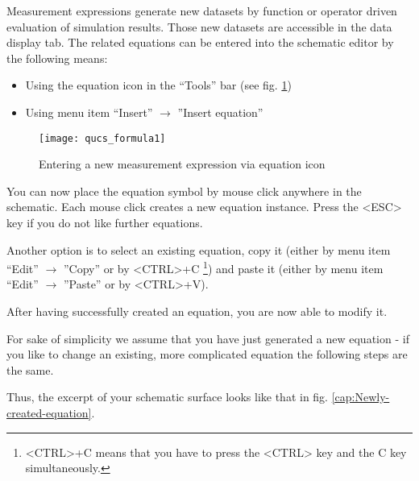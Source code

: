 \providecommand{\boldsymbol}[1]{\mbox{\boldmath $#1$}}

\providecommand{\tabularnewline}{\\}


Measurement expressions generate new datasets by function or operator
driven evaluation of simulation results. Those new datasets are accessible
in the data display tab. The related equations can be entered into
the schematic editor by the following means:

\begin{itemize}
\item Using the equation icon in the {}``Tools'' bar (see fig. \ref{cap:Entering})
\item Using menu item {}``Insert'' $\rightarrow$ ''Insert equation''
\end{itemize}
%
\begin{figure}[ht]
\begin{center}\texttt{[image: qucs\_formula1]}\end{center}


\caption{\label{cap:Entering}Entering a new measurement expression via equation
icon}
\end{figure}


\noindent You can now place the equation symbol by mouse click anywhere
in the schematic. Each mouse click creates a new equation instance.
Press the <ESC> key if you do not like further equations.

Another option is to select an existing equation, copy it (either
by menu item {}``Edit'' $\rightarrow$ ''Copy'' or by <CTRL>+C%
\footnote{<CTRL>+C means that you have to press the <CTRL> key and the C key
simultaneously.%
}) and paste it (either by menu item {}``Edit'' $\rightarrow$ ''Paste'' or
by <CTRL>+V).

After having successfully created an equation, you are now able to
modify it.



For sake of simplicity we assume that you have just generated a new
equation - if you like to change an existing, more complicated equation
the following steps are the same.

Thus, the excerpt of your schematic surface looks like that in fig.
\ref{cap:Newly-created-equation}.

